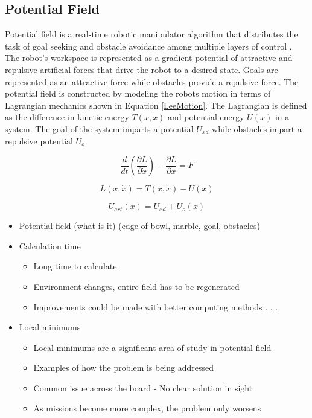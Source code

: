 \documentclass[numbered,pdftex]{ohio-etd}
\begin{document}
\subsection{Potential Field}
Potential field is a real-time robotic manipulator algorithm that distributes the task of goal seeking and obstacle avoidance among multiple layers of control \cite{khatib_real-time_1986}. The robot's workspace is represented as a gradient potential of attractive and repulsive artificial forces that drive the robot to a desired state. Goals are represented as an attractive force while obstacles provide a repulsive force. The potential field is constructed by modeling the robots motion in terms of Lagrangian mechanics shown in Equation \ref{LeeMotion}. The Lagrangian is defined as the difference in kinetic energy $T(x,\dot{x})$ and potential energy $U(x)$ in a system. The goal of the system imparts a potential $U_{xd}$ while obstacles impart a repulsive potential $U_o$. 

\begin{equation}\label{LeeMotion}
\frac{d}{dt} \left(\frac{\partial L}{\partial \dot{x}}\right) - \frac{\partial L}{\partial x} = F
\end{equation}

\begin{equation}\label{lagrange}
L(x,\dot{x}) = T(x,\dot{x}) - U(x)
\end{equation}

\begin{equation}\label{potential}
U_{art}(x) = U_{xd} + U_o(x)
\end{equation}





\begin{itemize}
	\item Potential field (what is it) (edge of bowl, marble, goal, obstacles)
	\item Calculation time
	\begin{itemize}
		\item Long time to calculate
		\item Environment changes, entire field has to be regenerated
		\item Improvements could be made with better computing methods . . .
	\end{itemize}
	
	\item Local minimums
	\begin{itemize}
		\item Local minimums are a significant area of study in potential field
		\item Examples of how the problem is being addressed
		\item Common issue across the board - No clear solution in sight
		\item As missions become more complex, the problem only worsens
	\end{itemize}
	
\end{itemize}
\end{document}
